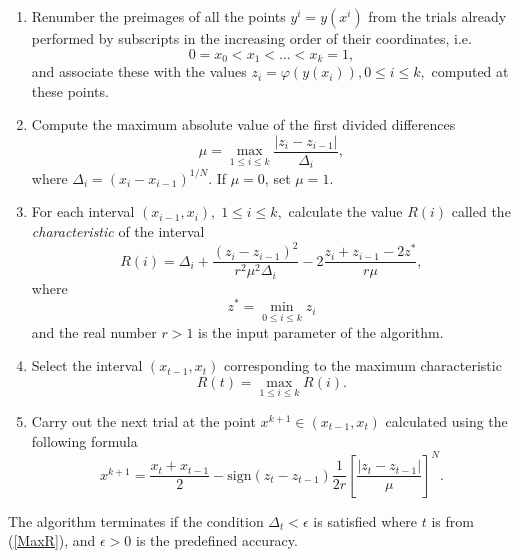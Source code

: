 \documentclass[runningheads]{llncs}
\begin{document}
\begin{enumerate}
	\item 
	Renumber the preimages of all the points $y^i=y(x^i)$
	from the trials already performed  	
by subscripts in the increasing order of their coordinates, i.e.
\begin{equation}\label{x_i}
0=x_0<x_1<\dots <x_k=1,
\end{equation}
and associate these with the values $z_i=\varphi(y(x_i)), 0\leq i \leq k,$ 
computed at these points.
\item
Compute the maximum absolute value of the first divided differences
\begin{equation}\label{mu}
\mu = \max_{1 \leq i \leq k}\frac{\left|z_i-z_{i-1}\right|}{\Delta_i},
\end{equation}
where $\Delta_i=\left(x_i-x_{i-1}\right)^{1/N}$. If $\mu = 0$, set $\mu = 1$.
\item
For each interval $(x_{i-1}, x_i), \; 1\leq i \leq k,$  calculate the value 
$R(i)$ called the \textit{characteristic} of the interval
\begin{equation}\label{R}
R(i)=\Delta_i+\frac{(z_i-z_{i-1})^2}{r^2\mu^2\Delta_i}-2\frac{z_i+z_{i-1}-2z^*}{r\mu},
\end{equation}
where 
\begin{equation}\label{z}
z^*= \min_{0\leq i\leq k}z_i
\end{equation} 
and the real number $r>1$ is 
the input parameter of the algorithm.
\item 
Select the interval $(x_{t-1},x_t)$ corresponding to the maximum characteristic
\begin{equation}\label{MaxR}
R(t)= \max_{1 \leq i \leq k}R(i).
\end{equation}
\item
Carry out the next trial at the point $x^{k+1}\in(x_{t-1},x_t)$ calculated using
the following formula
\begin{equation}\label{xk1}
x^{k+1} = \frac{x_t+x_{t-1}}{2} - \mathrm{sign}(z_t-z_{t-1})\frac{1}{2r}
\left[\frac{\left|z_t-z_{t-1}\right|}{\mu}\right]^N.
\end{equation}
\end{enumerate}

The algorithm terminates if the condition $\Delta_t < \epsilon$ is satisfied
where $t$ is from (\ref{MaxR}), and $\epsilon>0$ is the predefined accuracy. 
\end{document}

